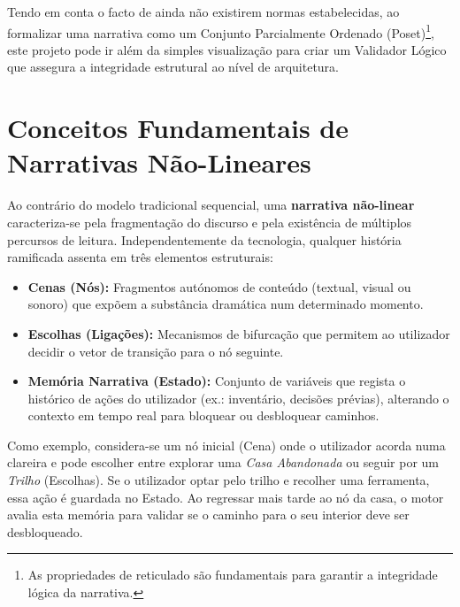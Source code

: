 Tendo em conta o facto de ainda não existirem normas estabelecidas, ao formalizar uma narrativa como um Conjunto Parcialmente Ordenado (Poset)\footnote{As propriedades de reticulado são fundamentais para garantir a integridade lógica da narrativa.}, este projeto pode ir além da simples visualização para criar um Validador Lógico que assegura a integridade estrutural ao nível de arquitetura.

\section{Conceitos Fundamentais de Narrativas Não-Lineares}
\label{sec:conceitos-fundamentais}
Ao contrário do modelo tradicional sequencial, uma \textbf{narrativa não-linear} caracteriza-se pela fragmentação do discurso e pela existência de múltiplos percursos de leitura. Independentemente da tecnologia, qualquer história ramificada assenta em três elementos estruturais:

\begin{itemize}
    \item \textbf{Cenas (Nós):} Fragmentos autónomos de conteúdo (textual, visual ou sonoro) que expõem a substância dramática num determinado momento.
    \item \textbf{Escolhas (Ligações):} Mecanismos de bifurcação que permitem ao utilizador decidir o vetor de transição para o nó seguinte.
    \item \textbf{Memória Narrativa (Estado):} Conjunto de variáveis que regista o histórico de ações do utilizador (ex.: inventário, decisões prévias), alterando o contexto em tempo real para bloquear ou desbloquear caminhos.
\end{itemize}

Como exemplo, considera-se um nó inicial (Cena) onde o utilizador acorda numa clareira e pode escolher entre explorar uma \textit{Casa Abandonada} ou seguir por um \textit{Trilho} (Escolhas). Se o utilizador optar pelo trilho e recolher uma ferramenta, essa ação é guardada no Estado. Ao regressar mais tarde ao nó da casa, o motor avalia esta memória para validar se o caminho para o seu interior deve ser desbloqueado.


